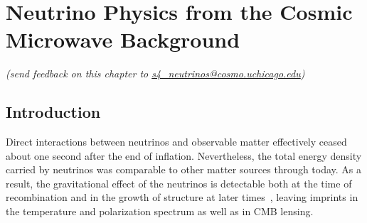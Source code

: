  
\chapter{Neutrino Physics from the Cosmic Microwave Background}


\def\beq{\begin{equation}}
\def\eeq{\end{equation}}

\def\bea{\begin{eqnarray}}
\def\eea{\end{eqnarray}}

\def\Neff{N_{\rm eff}}
\def\Nf{N_{\rm eff}}
\def\gs{g_{\star}}
\def\Mpl{M_{\rm pl}}
\newcommand{\nucl}[3]{ \ensuremath{ \phantom{\ensuremath{^{#1}_{#2}}} \llap{\ensuremath{^{#1}}} \llap{\ensuremath{_{\rule{0pt}{.75em}#2}}} \mbox{#3} } }


\def\gtrsim{\raise-.75ex\hbox{$\buildrel>\over\sim$}}

\begin{center}
{\small \it (send feedback on this chapter to \href{mailto:s4_neutrinos@cosmo.uchicago.edu}{s4\_neutrinos@cosmo.uchicago.edu})}
\end{center}

\section{Introduction}



Direct interactions between neutrinos and observable matter effectively ceased about one second after the end of inflation.  Nevertheless, the total energy density carried by neutrinos was comparable to other matter sources through today.  As a result, the gravitational effect of the neutrinos is detectable both at the time of recombination and in the growth of structure at later times~\cite{Abazajian:2013oma}, leaving imprints in the temperature and polarization spectrum as well as in CMB lensing.

